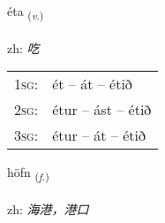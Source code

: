 \documentclass[frontgrid, backgrid]{flacards}\usepackage[]{graphicx}\usepackage[]{color}
\begin{document}
\renewcommand{\blhead}{\vskip5pt {\small\bfseries\footnotesize Sagnorð | 动词 }}
\renewcommand{\bcfoot}{\vskip5pt \hspace{2pt}{\small\bfseries\footnotesize 2K}}


{éta \small{\textsubscript{(\textit{v.})}} \\[1ex] %
\textphonetic{[jɛːta]} \\
zh: \emph{吃} \\  [2ex]
\renewcommand*{\arraystretch}{0.8}
\begin{tabular}{p{1cm}l}
\textsc{1sg}: & ét -- át -- étið \\ 
\textsc{2sg}: & étur -- ást -- étið \\ 
\textsc{3sg}: & étur -- át -- étið \\ 
\end{tabular}
}

\renewcommand{\flhead}{\vskip5pt \fboxsep=0pt {\small\bfseries\footnotesize Nafnorð | 名词}}
\renewcommand{\fcfoot}{\vskip5pt \fboxsep=0pt \hspace{2pt}{\small\bfseries\footnotesize 2K}}

\renewcommand{\blhead}{\vskip5pt {\small\bfseries\footnotesize Nafnorð | 名词 }}
\renewcommand{\bcfoot}{\vskip5pt \hspace{2pt}{\small\bfseries\footnotesize 2K}}


{höfn \small{\textsubscript{(\textit{f.})}} \\[1ex] %
\textphonetic{[hœpn̥]} \\
zh: \emph{海港，港口} \\  [2ex]
\renewcommand*{\arraystretch}{0.8}
}

\renewcommand{\flhead}{\vskip5pt \fboxsep=0pt {\small\bfseries\footnotesize Sagnorð | 动词}}
\renewcommand{\fcfoot}{\vskip5pt \fboxsep=0pt \hspace{2pt}{\small\bfseries\footnotesize 2K}}
\end{document}
